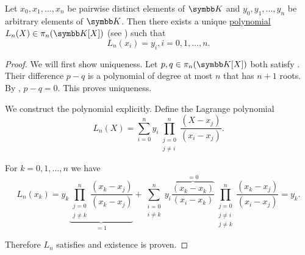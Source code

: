 \begin{theorem}\label{thm:lagrange_interpolation}
  Let \( x_0, x_1, \ldots, x_n \) be pairwise distinct elements of \( \BK \) and \( y_0, y_1, \ldots, y_n \) be arbitrary elements of \( \BK \). Then there exists a unique \hyperref[def:polynomial]{polynomial} \( L_n(X) \in \pi_n(\BK[X]) \) (see ) such that
  \begin{equation}\label{thm:lagrange_interpolation/condition}
    L_n(x_i) = y_i, i = 0, 1, \ldots, n.
  \end{equation}
\end{theorem}
\begin{proof}
  We will first show uniqueness. Let \( p, q \in \pi_n(\BK[X]) \) both satisfy . Their difference \( p - q \) is a polynomial of degree at most \( n \) that has \( n + 1 \) roots. By , \( p - q = 0 \). This proves uniqueness.

  We construct the polynomial explicitly. Define the Lagrange polynomial
  \begin{equation*}
    L_n(X) = \sum_{i=0}^n y_i \prod_{\substack{j = 0 \\ j \neq i}}^n \frac {(X - x_j)} {(x_i - x_j)}.
  \end{equation*}

  For \( k = 0, 1, \ldots, n \) we have
  \begin{equation*}
    L_n(x_k) = y_k \underbrace{\prod_{\substack{j = 0 \\ j \neq k}}^n \frac {(x_k - x_j)} {(x_k - x_j)}}_{=1} + \sum_{\substack{i = 0 \\ i \neq k}}^n y_i \overbrace{\frac{(x_k - x_k)}{(x_i - x_k)}}^{=0} \prod_{\substack{j = 0 \\ j \neq i \\ j \neq k}}^n \frac {(x_k - x_j)} {(x_i - x_j)} = y_k.
  \end{equation*}

  Therefore \( L_n \) satisfies  and existence is proven.
\end{proof}
